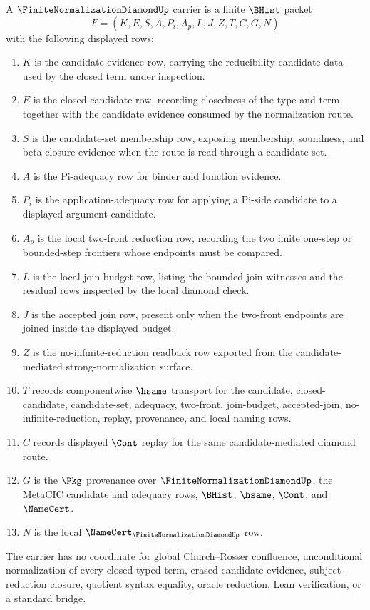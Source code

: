 \begin{definition}
\label{def:finite-normalization-diamond-carrier}
A $\FiniteNormalizationDiamondUp$ carrier is a finite $\BHist$ packet
$$
F=(K,E,S,A,P_i,A_p,L,J,Z,T,C,G,N)
$$
with the following displayed rows:
\begin{enumerate}
\item $K$ is the candidate-evidence row, carrying the reducibility-candidate data used by the closed term under inspection.
\item $E$ is the closed-candidate row, recording closedness of the type and term together with the candidate evidence consumed by the normalization route.
\item $S$ is the candidate-set membership row, exposing membership, soundness, and beta-closure evidence when the route is read through a candidate set.
\item $A$ is the Pi-adequacy row for binder and function evidence.
\item $P_i$ is the application-adequacy row for applying a Pi-side candidate to a displayed argument candidate.
\item $A_p$ is the local two-front reduction row, recording the two finite one-step or bounded-step frontiers whose endpoints must be compared.
\item $L$ is the local join-budget row, listing the bounded join witnesses and the residual rows inspected by the local diamond check.
\item $J$ is the accepted join row, present only when the two-front endpoints are joined inside the displayed budget.
\item $Z$ is the no-infinite-reduction readback row exported from the candidate-mediated strong-normalization surface.
\item $T$ records componentwise $\hsame$ transport for the candidate, closed-candidate, candidate-set, adequacy, two-front, join-budget, accepted-join, no-infinite-reduction, replay, provenance, and local naming rows.
\item $C$ records displayed $\Cont$ replay for the same candidate-mediated diamond route.
\item $G$ is the $\Pkg$ provenance over $\FiniteNormalizationDiamondUp$, the MetaCIC candidate and adequacy rows, $\BHist$, $\hsame$, $\Cont$, and $\NameCert$.
\item $N$ is the local $\NameCert_{\FiniteNormalizationDiamondUp}$ row.
\end{enumerate}
The carrier has no coordinate for global Church--Rosser confluence, unconditional normalization of every closed typed term, erased candidate evidence, subject-reduction closure, quotient syntax equality, oracle reduction, Lean verification, or a standard bridge.
\end{definition}

